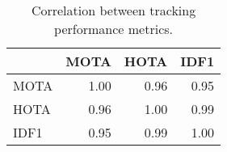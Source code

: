 \begin{table}[htbp]
\centering
\caption{Correlation between tracking performance metrics.}
\label{tab:correlation_metrics}
\begin{tabular}{lrrr}
\toprule
 & MOTA & HOTA & IDF1 \\
\midrule
MOTA & 1.00 & 0.96 & 0.95 \\
HOTA & 0.96 & 1.00 & 0.99 \\
IDF1 & 0.95 & 0.99 & 1.00 \\
\bottomrule
\end{tabular}
\end{table}
